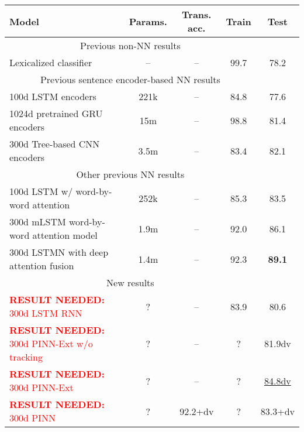 \documentclass[11pt,letterpaper]{article}
\newcommand\result[1]{\textcolor{red}{\textbf{RESULT NEEDED:} #1}}
\begin{document}
\begin{table*}[t]
  \centering\small
  \begin{tabular}{lcccc} 
    \toprule
Model                   & Params.    & Trans. acc.  &   Train  &   Test \\
\midrule
\multicolumn{4}{c}{Previous non-NN results}\\
\midrule
Lexicalized classifier \cite{snli:emnlp2015}
                        & --                & --                    &   99.7   &   78.2      \\
\midrule
\multicolumn{4}{c}{Previous sentence encoder-based NN results}\\
\midrule
100d LSTM encoders \cite{snli:emnlp2015}
                        & 221k               & --               &   84.8   &   77.6      \\
1024d pretrained GRU encoders \cite{DBLP:journals/corr/VendrovKFU15}
                        & 15m                & --              &   98.8   &   81.4       \\
300d Tree-based CNN encoders \cite{mou2015recognizing}
                        & 3.5m                & --             &   83.4   &   82.1       \\
\midrule
\multicolumn{4}{c}{Other previous NN results}\\
\midrule
100d LSTM w/ word-by-word attention \cite{rocktaschel2015reasoning}
                        & 252k               & --              &   85.3   &   83.5       \\
300d mLSTM word-by-word attention model \cite{DBLP:journals/corr/WangJ15b}
                        & 1.9m               & --             &   92.0   &   86.1      \\
300d LSTMN with deep attention fusion \cite{cheng2016long}
                        & 1.4m               & --                &   92.3   &   \textbf{89.1}      \\
\midrule
\multicolumn{4}{c}{New results}\\
\midrule
\result{300d LSTM RNN } & ?                  & --                &   83.9      &   80.6       \\
\result{300d PINN-Ext w/o tracking}   
                        & ?                  & --                &   ?      &   81.9dv       \\
\result{300d PINN-Ext }
                        & ?                  & --                &   ?      &   \underline{84.8dv}       \\
\result{300d PINN }
                        & ?                  & 92.2+dv                  &   ?    &   83.3+dv       \\          

\end{tabular}
\end{table*}
\end{document}
